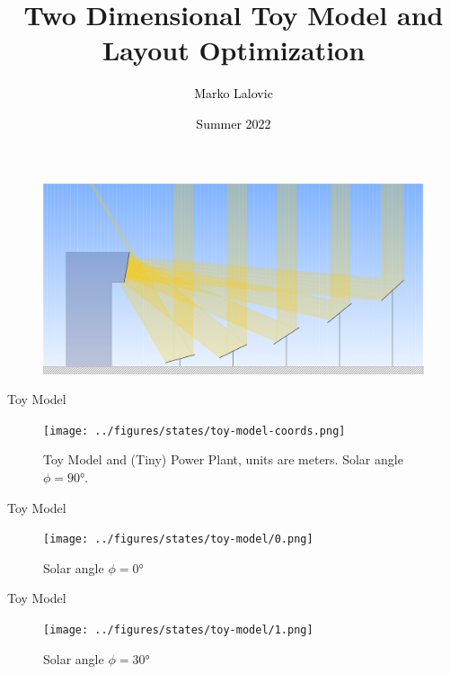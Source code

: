 \documentclass[10pt, xcolor={dvipsnames}]{beamer}
\title[2D Toy Model Layout Optimization]{Two Dimensional Toy Model and Layout Optimization}
\author[\textcolor{white}{Marko Lalovic}]{\textcolor{black}{Marko Lalovic} \vspace{-.2cm}}
\date[\textcolor{white}{July 12, 2022}]{\textcolor{black}{Summer 2022}}
\begin{document}
\begin{frame}
\begin{center}
\maketitle
\begin{figure}
    \includegraphics[width=\linewidth]{../figures/solar-toy-model-crop.pdf}
\end{figure}
\end{center}
\end{frame}


\begin{frame}{Toy Model}

\begin{center}
\begin{figure}
\texttt{[image: ../figures/states/toy-model-coords.png]}
\caption{Toy Model and (Tiny) Power Plant, units are meters. Solar angle $\phi = 90$°.}
\end{figure}
\end{center}
\end{frame}

\begin{frame}{Toy Model}
\begin{center}
\begin{figure}
\texttt{[image: ../figures/states/toy-model/0.png]}
\caption{Solar angle $\phi = 0$°}
\end{figure}
\end{center}
\end{frame}

\begin{frame}{Toy Model}
\begin{center}
\begin{figure}
\texttt{[image: ../figures/states/toy-model/1.png]}
\caption{Solar angle $\phi = 30$°}
\end{figure}
\end{center}
\end{frame}
\end{document}
